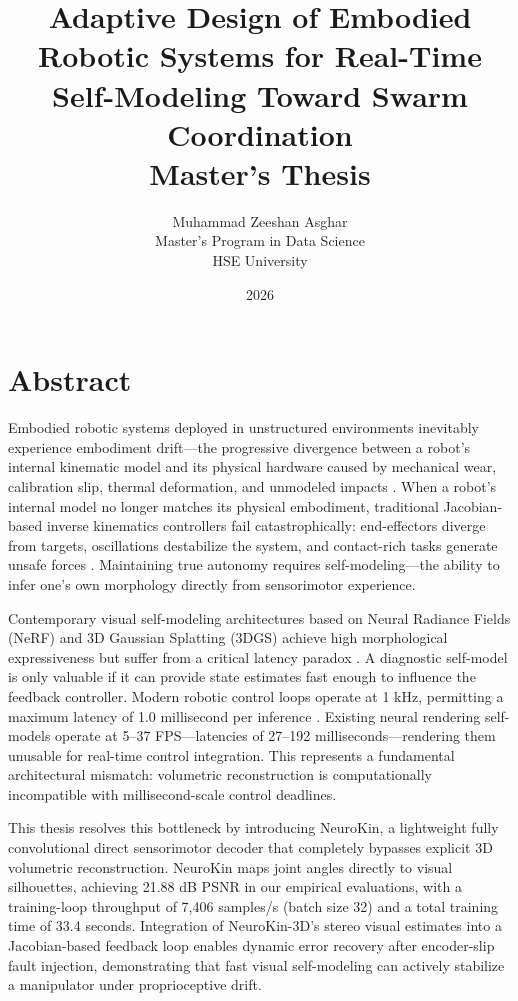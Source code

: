 \documentclass[12pt,a4paper,oneside]{report}
\title{
    \vspace{2cm}
    \textbf{\Large Adaptive Design of Embodied Robotic Systems for Real-Time Self-Modeling Toward Swarm Coordination} \\
    \vspace{1cm}
    \large Master's Thesis
}
\author{
    Muhammad Zeeshan Asghar \\
    Master's Program in Data Science \\
    HSE University
}
\date{\vspace{1cm} 2026}
\begin{document}
\maketitle
\clearpage

\chapter*{Abstract}

Embodied robotic systems deployed in unstructured environments inevitably experience embodiment drift—the progressive divergence between a robot's internal kinematic model and its physical hardware caused by mechanical wear, calibration slip, thermal deformation, and unmodeled impacts \cite{bongard2006resilient, cully2015robots}. When a robot's internal model no longer matches its physical embodiment, traditional Jacobian-based inverse kinematics controllers fail catastrophically: end-effectors diverge from targets, oscillations destabilize the system, and contact-rich tasks generate unsafe forces \cite{kwiatkowski2019task, chen2022full}. Maintaining true autonomy requires self-modeling—the ability to infer one's own morphology directly from sensorimotor experience.

Contemporary visual self-modeling architectures based on Neural Radiance Fields (NeRF) and 3D Gaussian Splatting (3DGS) achieve high morphological expressiveness but suffer from a critical latency paradox \cite{hu2024teaching, hu2025learning}. A diagnostic self-model is only valuable if it can provide state estimates fast enough to influence the feedback controller. Modern robotic control loops operate at 1 kHz, permitting a maximum latency of 1.0 millisecond per inference \cite{siciliano2009robotics}. Existing neural rendering self-models operate at 5–37 FPS—latencies of 27–192 milliseconds—rendering them unusable for real-time control integration. This represents a fundamental architectural mismatch: volumetric reconstruction is computationally incompatible with millisecond-scale control deadlines.

This thesis resolves this bottleneck by introducing NeuroKin, a lightweight fully convolutional direct sensorimotor decoder that completely bypasses explicit 3D volumetric reconstruction. NeuroKin maps joint angles directly to visual silhouettes, achieving 21.88 dB PSNR in our empirical evaluations, with a training-loop throughput of 7,406 samples/s (batch size 32) and a total training time of 33.4 seconds. Integration of NeuroKin-3D's stereo visual estimates into a Jacobian-based feedback loop enables dynamic error recovery after encoder-slip fault injection, demonstrating that fast visual self-modeling can actively stabilize a manipulator under proprioceptive drift.
\end{document}

